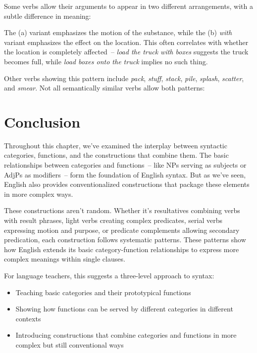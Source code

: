 Some verbs allow their arguments to appear in two different arrangements, with a subtle difference in meaning:

\ea\label{ex:spray-load}
   \z
\ex
   \z
\z

The (a) variant emphasizes the motion of the substance, while the (b) \textit{with} variant  emphasizes the effect on the location. This often correlates with whether the location is completely affected~-- \textit{load the truck with boxes} suggests the truck becomes full, while \textit{load boxes onto the truck} implies no such thing.

Other verbs showing this pattern include \textit{pack}, \textit{stuff}, \textit{stack}, \textit{pile}, \textit{splash}, \textit{scatter}, and \textit{smear}. Not all semantically similar verbs allow both patterns:

\ea\label{ex:spray-load-gaps}
   \z
\z{}

\section{Conclusion}

Throughout this chapter, we've examined the interplay between syntactic categories, functions, and the constructions that combine them. The basic relationships between categories and functions~-- like NPs serving as subjects or AdjPs as modifiers~-- form the foundation of English syntax. But as we've seen, English also provides conventionalized constructions that package these elements in more complex ways.

These constructions aren't random. Whether it's resultatives combining verbs with result phrases, light verbs creating complex predicates, serial verbs expressing motion and purpose, or predicate complements allowing secondary predication, each construction follows systematic patterns. These patterns show how English extends its basic category-function relationships to express more complex meanings within single clauses.

For language teachers, this suggests a three-level approach to syntax:
\begin{itemize}[noitemsep]
    \item Teaching basic categories and their prototypical functions
    \item Showing how functions can be served by different categories in different contexts
    \item Introducing constructions that combine categories and functions in more complex but still conventional ways
\end{itemize}

